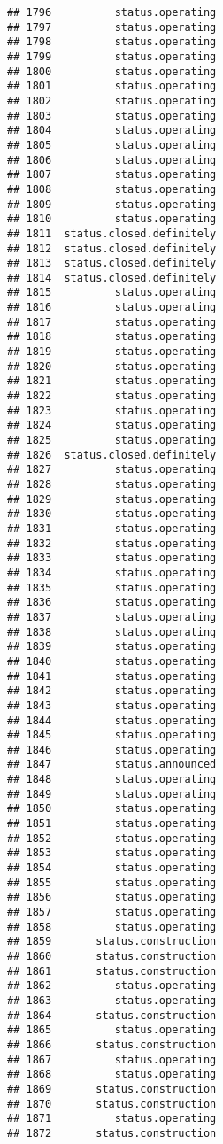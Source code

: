 \documentclass[
]{article}
\begin{document}
\begin{verbatim}
## 1796          status.operating
## 1797          status.operating
## 1798          status.operating
## 1799          status.operating
## 1800          status.operating
## 1801          status.operating
## 1802          status.operating
## 1803          status.operating
## 1804          status.operating
## 1805          status.operating
## 1806          status.operating
## 1807          status.operating
## 1808          status.operating
## 1809          status.operating
## 1810          status.operating
## 1811  status.closed.definitely
## 1812  status.closed.definitely
## 1813  status.closed.definitely
## 1814  status.closed.definitely
## 1815          status.operating
## 1816          status.operating
## 1817          status.operating
## 1818          status.operating
## 1819          status.operating
## 1820          status.operating
## 1821          status.operating
## 1822          status.operating
## 1823          status.operating
## 1824          status.operating
## 1825          status.operating
## 1826  status.closed.definitely
## 1827          status.operating
## 1828          status.operating
## 1829          status.operating
## 1830          status.operating
## 1831          status.operating
## 1832          status.operating
## 1833          status.operating
## 1834          status.operating
## 1835          status.operating
## 1836          status.operating
## 1837          status.operating
## 1838          status.operating
## 1839          status.operating
## 1840          status.operating
## 1841          status.operating
## 1842          status.operating
## 1843          status.operating
## 1844          status.operating
## 1845          status.operating
## 1846          status.operating
## 1847          status.announced
## 1848          status.operating
## 1849          status.operating
## 1850          status.operating
## 1851          status.operating
## 1852          status.operating
## 1853          status.operating
## 1854          status.operating
## 1855          status.operating
## 1856          status.operating
## 1857          status.operating
## 1858          status.operating
## 1859       status.construction
## 1860       status.construction
## 1861       status.construction
## 1862          status.operating
## 1863          status.operating
## 1864       status.construction
## 1865          status.operating
## 1866       status.construction
## 1867          status.operating
## 1868          status.operating
## 1869       status.construction
## 1870       status.construction
## 1871          status.operating
## 1872       status.construction

\end{verbatim}
\end{document}
